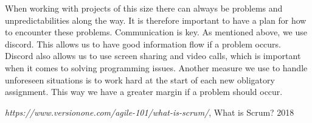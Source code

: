 \documentclass{article}
\begin{document}
When working with projects of this size there can always be problems and unpredictabilities along the way. It is therefore important to have a plan for how to encounter these problems. Communication is key. As mentioned above, we use discord. This allows us to have good information flow if a problem occurs. Discord also allows us to use screen sharing and video calls, which is important when it comes to solving programming issues. Another measure we use to handle unforeseen situations is to work hard at the start of each new obligatory assignment. This way we have a greater margin if a problem should occur. 
\newline


\begin{thebibliography}{9}
 
  \textit{https://www.versionone.com/agile-101/what-is-scrum/},
  What is Scrum?
  2018
  

\end{thebibliography}
\end{document}
